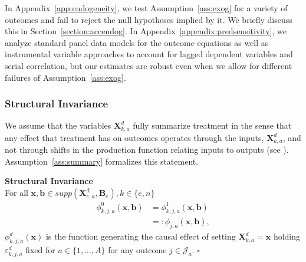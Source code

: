 In Appendix~\ref{app:endogeneity}, we test Assumption~\ref{ass:exog} for a variety of outcomes and fail to reject the null hypotheses implied by it. We briefly discuss this in Section~\ref{section:accendog}. In  Appendix~\ref{appendix:predsensitivity}, we analyze standard panel data models for the outcome equations as well as instrumental variable approaches to account for lagged dependent variables and serial correlation, but our estimates are robust even when we allow for different failures of Assumption~\ref{ass:exog}.  

\subsubsection{Structural Invariance}

We assume that the variables $\bm{X}_{k,a}^d$ fully summarize treatment in the sense that any effect that treatment has on outcomes operates through the inputs, $\bm{X}_{k,a}^d$, and not through shifts in the production function relating inputs to outputs (see \citealp{Heckman_Pinto_etal_2013_PerryFactor}). Assumption~\ref{ass:summary} formalizes this statement.

\onehalfspacing
\begin{assumption} \label{ass:summary} \textbf{Structural Invariance}\\
For all $\bm{x}, \bm{b} \in supp(\bm{X}^d_{e,a}, \bm{B}_e), k \in \{e,n\}$
\begin{align}
\phi_{k,j,a}^0 \left( \bm{x}, \bm{b} \right) &= \phi_{k,j,a}^1 (\bm{x}, \bm{b}) \\   \nonumber
                                                                     &=: \phi_{j,a} (\bm{x}, \bm{b}),
\end{align}
$\phi^d_{k,j,a}(\bm{x})$ is the function generating the causal effect of setting $\bm{X}^d_{k,a}=\bm{x}$ holding $\varepsilon^d_{k,j,a}$ fixed for $a \in \{1,\dots,A\}$ for any outcome $j \in \mathcal{J}_{a}$. $\square$
\end{assumption}
\doublespacing

